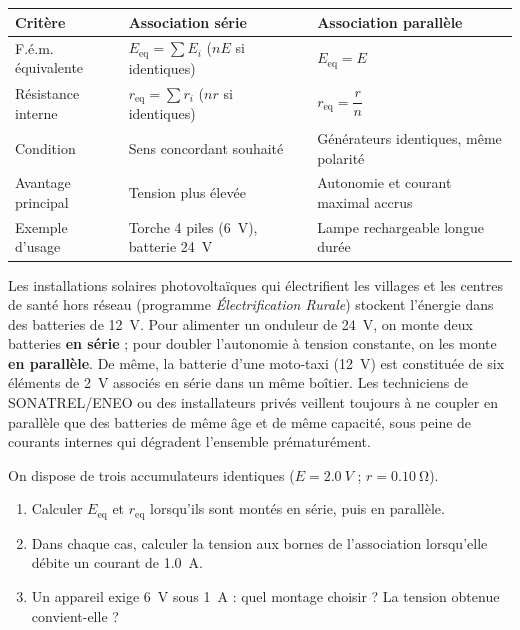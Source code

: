 \documentclass[11pt]{article}
\begin{document}
\begin{center}
\begin{tabularx}{\linewidth}{|l|X|X|}
\hline
\rowcolor{popblueL} \textbf{Critère} & \textbf{Association série} & \textbf{Association parallèle} \\
\hline
F.é.m. équivalente & $E_{\text{eq}} = \sum E_i$ ($nE$ si identiques) & $E_{\text{eq}} = E$ \\
\hline
Résistance interne & $r_{\text{eq}} = \sum r_i$ ($nr$ si identiques) & $r_{\text{eq}} = \dfrac{r}{n}$ \\
\hline
Condition & Sens concordant souhaité & Générateurs identiques, même polarité \\
\hline
Avantage principal & Tension plus élevée & Autonomie et courant maximal accrus \\
\hline
Exemple d'usage & Torche 4 piles (\SI{6}{V}), batterie \SI{24}{V} & Lampe rechargeable longue durée \\
\hline
\end{tabularx}
\end{center}

\begin{savaistu}
Les installations solaires photovoltaïques qui électrifient les villages et les centres de santé hors réseau (programme \emph{Électrification Rurale}) stockent l'énergie dans des batteries de \SI{12}{V}. Pour alimenter un onduleur de \SI{24}{V}, on monte deux batteries \textbf{en série} ; pour doubler l'autonomie à tension constante, on les monte \textbf{en parallèle}. De même, la batterie d'une moto-taxi (\SI{12}{V}) est constituée de six éléments de \SI{2}{V} associés en série dans un même boîtier. Les techniciens de SONATREL/ENEO ou des installateurs privés veillent toujours à ne coupler en parallèle que des batteries de même âge et de même capacité, sous peine de courants internes qui dégradent l'ensemble prématurément.
\end{savaistu}

\begin{exercice}
On dispose de trois accumulateurs identiques ($E = \SI{2,0}{V}$ ; $r = \SI{0,10}{\ohm}$).
\begin{enumerate}
\item Calculer $E_{\text{eq}}$ et $r_{\text{eq}}$ lorsqu'ils sont montés en série, puis en parallèle.
\item Dans chaque cas, calculer la tension aux bornes de l'association lorsqu'elle débite un courant de \SI{1,0}{A}.
\item Un appareil exige \SI{6}{V} sous \SI{1}{A} : quel montage choisir ? La tension obtenue convient-elle ?
\end{enumerate}
\end{exercice}
\end{document}
